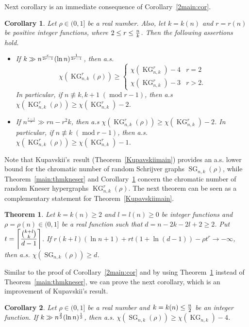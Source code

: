 \documentclass[11pt]{amsart}
\newtheorem{theorem}{Theorem} %
\newtheorem{corollary}{Corollary}
\theoremstyle{definition}
\theoremstyle{remark}
\def\ds{\displaystyle}
\def\KG{\operatorname{KG}}
\def\SG{\operatorname{SG}}
\def\mod{\operatorname{mod}}
\begin{document}

Next corollary is an immediate consequence of Corollary~\ref{2main:cor}.  
\begin{corollary}\label{corII}
	Let $\rho\in(0,1]$ be a real number. Also, let $k=k(n)$ and $r=r(n)$ be positive integer functions, where $2\leq r \leq {n\over k}$. Then the following assertions hold.
	\begin{itemize}
		\item[{\rm I)}] If $k\gg n^{r\over 2r-1}(\ln n)^{1\over 2r-1}$, 
		         then a.s. 
		         $$\chi(\KG^r_{n,k}(\rho))\geq\left\{	
				\begin{array}{ll}
					\chi(\KG^r_{n,k})-4 & r=2\\
					\chi(\KG^r_{n,k})-3 & r>2.
				\end{array}\right.$$
			 In particular, if  $n\not\equiv k,k+1\; (\mod r-1)$, then 
			 a.s $\chi(\KG^r_{n,k}(\rho))\geq\chi(\KG^r_{n,k})-2$.
		\item[{\rm II)}]  If  
			 $n^{\frac{r-1}{r}}\gg rn-r^2k $,  then a.s  
			$\chi(\KG^r_{n,k}(\rho))\geq\chi(\KG^r_{n,k})-2$. In particular, if
			$n\not\equiv k\; (\mod r-1)$, then a.s.  $\chi(\KG^r_{n,k}(\rho))
			\geq\chi(\KG^r_{n,k})-1$.
	\end{itemize}
\end{corollary}
Note that Kupavskii's~result (Theorem~\ref{Kupavskiimain}) provides an a.s. lower 
bound for the chromatic number of random Schrijver graphs $\SG_{n,k}(\rho)$, 
while Theorem~\ref{main:thmkneser} and Corollary~\ref{corII} concern the chromatic 
number of random Kneser  hypergraphs $\KG^r_{n,k}(\rho)$. 
The next theorem can be seen as a complementary statement for 
Theorem~\ref{Kupavskiimain}. 

\begin{theorem}\label{Kupavskiimainnew}
Let $k=k(n)\geq 2$ and $l=l(n)\geq 0$ be integer functions and $\rho=\rho(n)\in(0,1]$ 
be a real function such that  $d=n-2k-2l+2\geq 2$. Put $t=\ds\left\lceil{{k+l\choose k}\over d-1}\right\rceil$. If $r(k+l)(\ln n+1) +rt(1+\ln (d-1))-\rho t^r\rightarrow -\infty$,  then 
a.s. $\chi(\SG_{n,k}(\rho))\geq d$.
\end{theorem}

Similar to the proof of Corollary~\ref{2main:cor} and by using 
Theorem~\ref{Kupavskiimainnew} instead of 
Theorem~\ref{main:thmkneser}, we can prove the next corollary, which is an improvement of Kupavskii's result. 
\begin{corollary}\label{SGcor}
Let $\rho\in(0,1]$ be a real number and $k=k(n)\leq {n\over 2}$ be an integer function. 
If $k\gg n^{2\over 3}(\ln n)^{1\over 3}$, then a.s. 
$\chi(\SG_{n,k}(\rho))\geq \chi(\KG_{n,k})-4$. 
\end{corollary}
\end{document}
